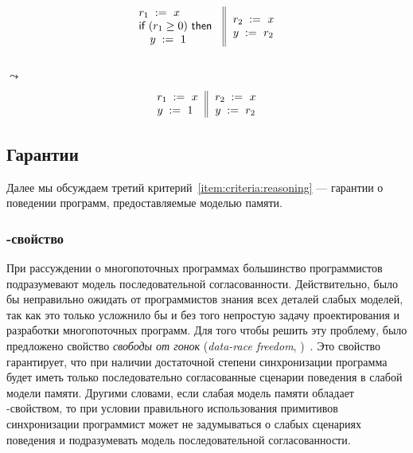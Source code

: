 {\footnotesize
\begin{minipage}{0.45\linewidth}
\begin{equation*}
\inarrII{
   \readInst{}{r_1}{x}             \\
   \kw{if} (r_1 \geq 0) ~\kw{then} \\
   \quad\writeInst{}{y}{1}         \\
}{
  \readInst{}{r_2}{x}               \\
  \writeInst{}{y}{r_2}              \\
}
\end{equation*}
\end{minipage}\hfill%
\begin{minipage}{0.05\linewidth}
\Large~\\ $\leadsto$
\end{minipage}\hfill%
\begin{minipage}{0.4\linewidth}
\begin{equation*}
\inarrII{
   \readInst{}{r_1}{x}             \\
   \writeInst{}{y}{1}              \\
}{
  \readInst{}{r_2}{x}               \\
  \writeInst{}{y}{r_2}              \\
}
\end{equation*}
\end{minipage}
}

\subsection{Гарантии}

Далее мы обсуждаем третий критерий~\ref{item:criteria:reasoning} ---
гарантии о поведении программ, предоставляемые моделью памяти.

\subsubsection{\DRF-свойство}
\label{sec:background:drf}

При рассуждении о многопоточных программах  
большинство программистов подразумевают 
модель последовательной согласованности. 
Действительно, было бы неправильно ожидать
от программистов знания всех деталей слабых моделей, 
так как это только усложнило бы и без того 
непростую задачу проектирования и разработки
многопоточных программ. 
Для того чтобы решить эту проблему, 
было предложено свойство \emph{свободы от гонок}
(\emph{data-race freedom}, \DRF)~\cite{Manson-al:POPL05}.
Это свойство гарантирует, что при наличии 
достаточной степени синхронизации программа будет иметь 
только последовательно согласованные сценарии поведения в слабой модели памяти. 
Другими словами, если слабая модель памяти обладает \DRF-свойством, 
то при условии правильного использования примитивов синхронизации
программист может не задумываться о слабых сценариях поведения 
и подразумевать модель последовательной согласованности.

